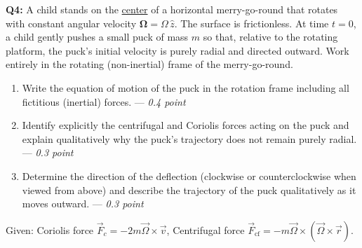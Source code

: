 \documentclass[a4paper,12pt]{article}
\begin{document}
\vspace*{0.1cm}
\textbf{Q4:} A child stands on the \underline{center} of a horizontal merry-go-round that rotates with constant angular velocity $\boldsymbol{\Omega}=\Omega \,\hat{z}$. The surface is frictionless. At time \(t=0\), a child gently pushes a small puck of mass $m$ so that, relative to the rotating platform, the puck’s initial velocity is purely radial and directed outward. Work entirely in the rotating (non-inertial) frame of the merry-go-round.

\begin{enumerate}
    \item[\textbf{a.}] Write the equation of motion of the puck in the rotation frame including all fictitious (inertial) forces. --- \textit{0.4 point}
    \item[\textbf{b.}] Identify explicitly the centrifugal and Coriolis forces acting on the puck and explain qualitatively why the puck’s trajectory does not remain purely radial. --- \textit{0.3 point}
    \item[\textbf{c.}] Determine the direction of the deflection (clockwise or counterclockwise when viewed from above) and describe the trajectory of the puck qualitatively as it moves outward. --- \textit{0.3 point}
\end{enumerate}

Given: Coriolis force $\vec{F}_c = -2m \vec{\Omega} \times \vec{v}$, Centrifugal force $\vec{F}_{\text{cf}} = -m \vec{\Omega} \times (\vec{\Omega} \times \vec{r})$.
    
\end{document}
